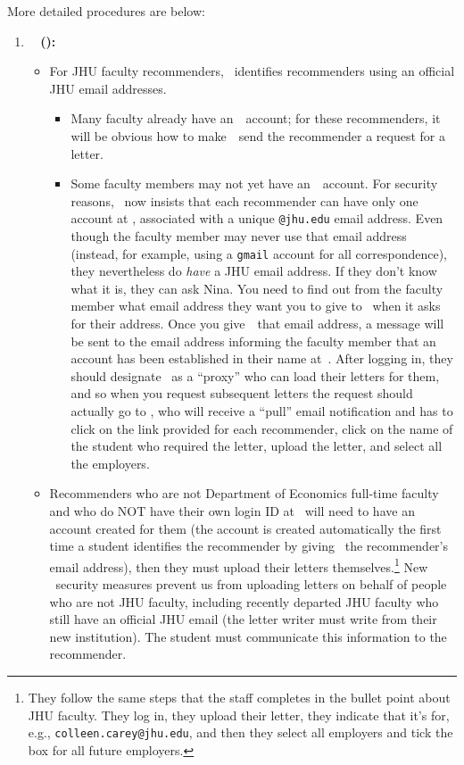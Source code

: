 \documentclass{econtex}
\begin{document}
More detailed procedures are below:
\begin{enumerate}

\item {\bf \EJM ~ (\EJMLink):}
\begin{itemize}
\item For JHU faculty recommenders, \EJM~identifies recommenders using
  an official JHU email addresses.  

\begin{itemize}
\item Many faculty already have an~\EJM~account; for these
  recommenders, it will be obvious how to make~\EJM~send the
  recommender a request for a letter.

\item Some faculty members may not yet have an~\EJM~account.  
For security reasons, \EJM~now insists that each
  recommender can have only one account at \EJM, associated with a
  unique \texttt{@jhu.edu} email address.  Even though the faculty member may never use
  that email address (instead, for example, using a \texttt{gmail}
  account for all correspondence), they nevertheless do {\it have} a
  JHU email address.  If they don't know what it is, they can ask
  Nina.  You need to find out from the faculty member what email
  address they want you to give to \EJM~when it asks for their address.  Once you
  give~\EJM~that email address, a message will be sent to the email
  address informing the faculty member that an account has been
  established in their name at~\EJM.  After logging in, they should
  designate \JMStaffEmail~as a ``proxy'' who can load their letters
  for them, and so when you request subsequent letters the request should
  actually go to \JMStaffEmail, who will receive a ``pull'' email
  notification and has to click on the link provided for each
  recommender, click on the name of the student who required the
  letter, upload the letter, and select all the employers.

\end{itemize}


\item Recommenders who are not Department of Economics full-time faculty and who do NOT have their own
login ID at \EJM~will need to have an account created for them (the account is created automatically the first time a student identifies the recommender by giving \EJM~the recommender's email address), then they must upload their letters themselves.\footnote{They follow the same steps that the
    staff completes in the bullet point about JHU faculty.  They
    log in, they upload their letter, they indicate that it's for, e.g.,
    \texttt{colleen.carey@jhu.edu}, and then they select all employers and tick the box for all
    future employers.}
New \EJM~security measures prevent us from uploading letters on behalf of people
who are not JHU faculty, including recently departed JHU faculty who still have an official JHU email (the letter writer must write from their new institution).  The student must communicate this information to
  the recommender.


\end{itemize}
\end{enumerate}
\end{document}
